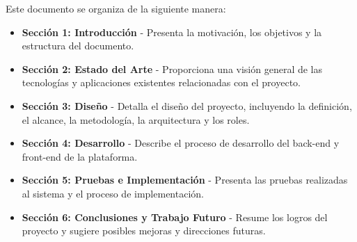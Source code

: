 Este documento se organiza de la siguiente manera:

\begin{itemize}
    \item \textbf{Sección 1: Introducción} - Presenta la motivación, los objetivos y la estructura del documento.
    \item \textbf{Sección 2: Estado del Arte} - Proporciona una visión general de las tecnologías y aplicaciones existentes relacionadas con el proyecto.
    \item \textbf{Sección 3: Diseño} - Detalla el diseño del proyecto, incluyendo la definición, el alcance, la metodología, la arquitectura y los roles.
    \item \textbf{Sección 4: Desarrollo} - Describe el proceso de desarrollo del back-end y front-end de la plataforma.
    \item \textbf{Sección 5: Pruebas e Implementación} - Presenta las pruebas realizadas al sistema y el proceso de implementación.
    \item \textbf{Sección 6: Conclusiones y Trabajo Futuro} - Resume los logros del proyecto y sugiere posibles mejoras y direcciones futuras.
\end{itemize}